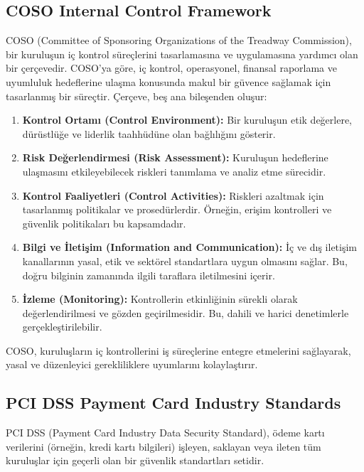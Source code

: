 \subsection{COSO Internal Control Framework}

COSO (Committee of Sponsoring Organizations of the Treadway Commission), bir kuruluşun iç kontrol süreçlerini tasarlamasına ve uygulamasına yardımcı olan bir çerçevedir. COSO'ya göre, iç kontrol, operasyonel, finansal raporlama ve uyumluluk hedeflerine ulaşma konusunda makul bir güvence sağlamak için tasarlanmış bir süreçtir. Çerçeve, beş ana bileşenden oluşur:

\begin{enumerate}
    \item \textbf{Kontrol Ortamı (Control Environment):} Bir kuruluşun etik değerlere, dürüstlüğe ve liderlik taahhüdüne olan bağlılığını gösterir.
    \item \textbf{Risk Değerlendirmesi (Risk Assessment):} Kuruluşun hedeflerine ulaşmasını etkileyebilecek riskleri tanımlama ve analiz etme sürecidir.
    \item \textbf{Kontrol Faaliyetleri (Control Activities):} Riskleri azaltmak için tasarlanmış politikalar ve prosedürlerdir. Örneğin, erişim kontrolleri ve güvenlik politikaları bu kapsamdadır.
    \item \textbf{Bilgi ve İletişim (Information and Communication):} İç ve dış iletişim kanallarının yasal, etik ve sektörel standartlara uygun olmasını sağlar. Bu, doğru bilginin zamanında ilgili taraflara iletilmesini içerir.
    \item \textbf{İzleme (Monitoring):} Kontrollerin etkinliğinin sürekli olarak değerlendirilmesi ve gözden geçirilmesidir. Bu, dahili ve harici denetimlerle gerçekleştirilebilir.
\end{enumerate}

COSO, kuruluşların iç kontrollerini iş süreçlerine entegre etmelerini sağlayarak, yasal ve düzenleyici gerekliliklere uyumlarını kolaylaştırır.

\subsection{PCI DSS Payment Card Industry Standards}

PCI DSS (Payment Card Industry Data Security Standard), ödeme kartı verilerini (örneğin, kredi kartı bilgileri) işleyen, saklayan veya ileten tüm kuruluşlar için geçerli olan bir güvenlik standartları setidir.



